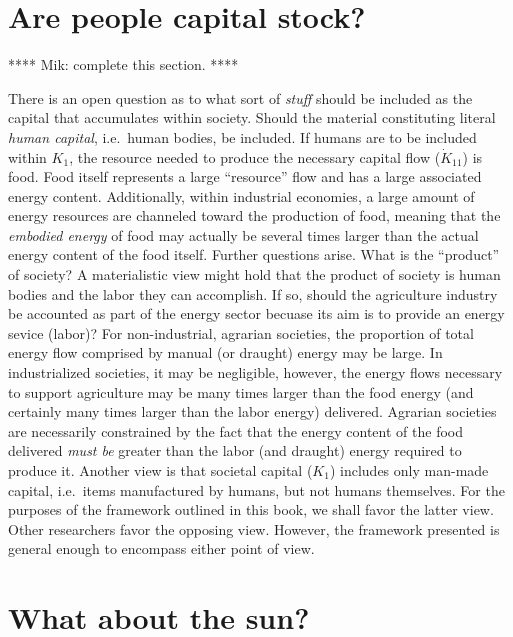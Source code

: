 \section{Are people capital stock?}
\label{sec:people_as_stock}

**** Mik: complete this section. ****

There is an open
question as to what sort of \emph{stuff} 
should be included as the capital
that accumulates within society. 
Should the material constituting literal
\emph{human capital}, 
i.e.~human bodies, 
be included. 
If humans are to be included within $K_{1}$, 
the resource needed to produce the necessary capital
flow ($\dot{K}_{11}$) is food. 
Food itself represents a large ``resource''
flow and has a large associated energy content. 
Additionally, 
within industrial economies, 
a large amount of energy resources 
are channeled toward the production of food, 
meaning that the \emph{embodied energy}
of food may actually be several times larger than
the actual energy content of the food itself. 
Further questions arise. 
What is the ``product'' of society? 
A materialistic view might hold that the product of
society is human bodies and the labor they can accomplish. 
If so, 
should the agriculture industry 
be accounted as part of the energy sector 
becuase its aim is to provide 
an energy sevice (labor)? 
For non-industrial, agrarian societies, 
the proportion of total energy flow 
comprised by manual (or draught) energy 
may be large. 
In industrialized societies, 
it may be negligible, 
however, 
the energy flows necessary to support agriculture
may be many times larger than the food energy
(and certainly many times larger 
than the labor energy) 
delivered. 
Agrarian societies
are necessarily constrained by the fact that the energy content of the food delivered 
\emph{must be} greater than the labor (and draught) energy required to produce it.
Another view is that societal capital ($K_{1}$) includes only man-made capital, 
i.e.\ items manufactured by humans,
but not humans themselves. 
For the purposes of the framework outlined in this book, 
we shall favor the latter view.
Other researchers favor the opposing view.\cite{Giampietro2013}
However,
the framework presented is general enough to encompass either point of view.


\section{What about the sun?}
\label{sec:emergy}

